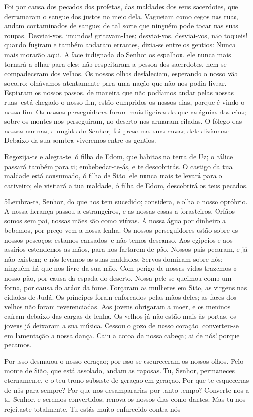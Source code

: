 Foi por causa dos pecados dos profetas, das maldades dos seus
sacerdotes, que derramaram o sangue dos justos no meio dela.
Vagueiam como cegos nas ruas, andam contaminados de sangue;
de tal sorte que ninguém pode tocar nas suas roupas.
Desviai-vos, imundos! gritavam-lhes; desviai-vos,
desviai-vos, não toqueis! quando fugiram e também andaram errantes,
dizia-se entre os gentios: Nunca mais morarão aqui. A face
indignada do Senhor  os espalhou, ele nunca mais tornará a olhar
para eles; não respeitaram a pessoa dos sacerdotes, nem se
compadeceram dos velhos. Os nossos olhos desfaleciam,
esperando o nosso vão socorro; olhávamos atentamente para uma nação
que não nos podia livrar. Espiaram os nossos passos, de
maneira que não podíamos andar pelas nossas ruas; está chegado o
nosso fim, estão cumpridos os nossos dias, porque é vindo o nosso
fim. Os nossos perseguidores foram mais ligeiros do que as
águias dos céus; sobre os montes nos perseguiram, no deserto nos
armaram ciladas. O fôlego das nossas narinas, o ungido do
Senhor, foi preso nas suas covas; dele dizíamos: Debaixo da sua
sombra viveremos entre os gentios.

Regozija-te e alegra-te, ó filha de Edom, que habitas na terra de
Uz; o cálice passará também para ti; embebedar-te-ás, e te
descobrirás. O castigo da tua maldade está consumado, ó filha
de Sião; ele nunca mais te levará para o cativeiro; ele visitará a
tua maldade, ó filha de Edom, descobrirá os teus pecados.

\medskip

\lettrine{5} Lembra-te, Senhor, do que nos tem sucedido;
considera, e olha o nosso opróbrio. A nossa herança passou a
estrangeiros, e as nossas casas a forasteiros. Órfãos somos sem
pai, nossas mães são como viúvas. A nossa água por dinheiro a
bebemos, por preço vem a nossa lenha. Os nossos perseguidores
estão sobre os nossos pescoços; estamos cansados, e não temos
descanso. Aos egípcios e aos assírios estendemos as mãos, para
nos fartarem de pão. Nossos pais pecaram, e já não existem; e
nós levamos as suas maldades. Servos dominam sobre nós; ninguém
há que nos livre da sua mão. Com perigo de nossas vidas trazemos
o nosso pão, por causa da espada do deserto. Nossa pele se
queimou como um forno, por causa do ardor da fome. Forçaram
as mulheres em Sião, as virgens nas cidades de Judá. Os
príncipes foram enforcados pelas mãos deles; as faces dos velhos não
foram reverenciadas. Aos jovens obrigaram a moer, e os
meninos caíram debaixo das cargas de lenha. Os velhos já não
estão mais às portas, os jovens já deixaram a sua música.
Cessou o gozo de nosso coração; converteu-se em lamentação a
nossa dança. Caiu a coroa da nossa cabeça; ai de nós! porque
pecamos.

Por isso desmaiou o nosso coração; por isso se escureceram os
nossos olhos. Pelo monte de Sião, que está assolado, andam as
raposas. Tu, Senhor, permaneces eternamente, e o teu trono
subsiste de geração em geração. Por que te esquecerias de nós
para sempre? Por que nos desampararias por tanto tempo?
Converte-nos a ti, Senhor, e seremos convertidos; renova os
nossos dias como dantes. Mas tu nos rejeitaste totalmente. Tu
estás muito enfurecido contra nós.

